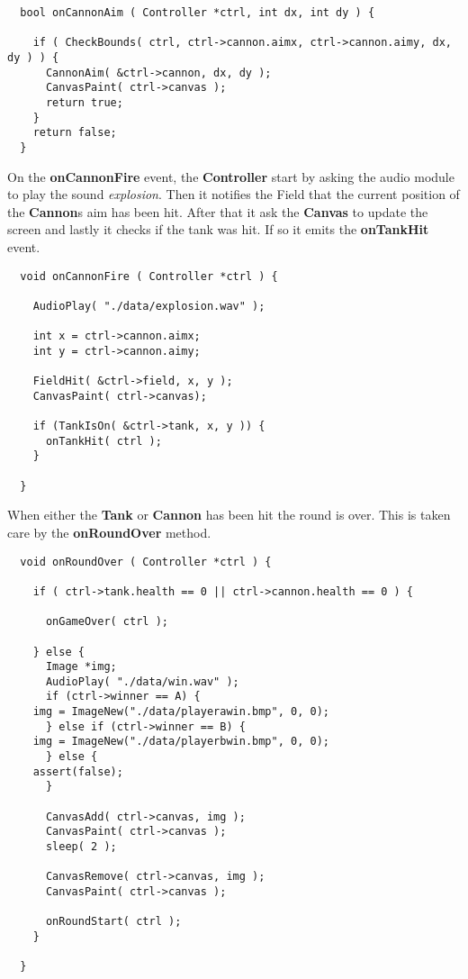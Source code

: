 \begin{lstlisting}
  bool onCannonAim ( Controller *ctrl, int dx, int dy ) {

    if ( CheckBounds( ctrl, ctrl->cannon.aimx, ctrl->cannon.aimy, dx, dy ) ) {
      CannonAim( &ctrl->cannon, dx, dy );
      CanvasPaint( ctrl->canvas );
      return true;
    }
    return false;
  }
\end{lstlisting}

On the {\bf onCannonFire} event, the {\bf Controller} start by asking the audio module to play the
sound {\it explosion}. Then it notifies the Field that the current position of the {\bf Cannon}s aim
has been hit. After that it ask the {\bf Canvas} to update the screen and lastly it checks if the
tank was hit. If so it emits the {\bf onTankHit} event.
\begin{lstlisting}
  void onCannonFire ( Controller *ctrl ) {

    AudioPlay( "./data/explosion.wav" );

    int x = ctrl->cannon.aimx;
    int y = ctrl->cannon.aimy;

    FieldHit( &ctrl->field, x, y );
    CanvasPaint( ctrl->canvas);

    if (TankIsOn( &ctrl->tank, x, y )) {
      onTankHit( ctrl );
    }

  }
\end{lstlisting}

When either the {\bf Tank} or {\bf Cannon} has been hit the round is over. This is
taken care by the {\bf onRoundOver} method.
\begin{lstlisting}
  void onRoundOver ( Controller *ctrl ) {

    if ( ctrl->tank.health == 0 || ctrl->cannon.health == 0 ) {

      onGameOver( ctrl );

    } else {
      Image *img;
      AudioPlay( "./data/win.wav" );
      if (ctrl->winner == A) {
	img = ImageNew("./data/playerawin.bmp", 0, 0);
      } else if (ctrl->winner == B) {
	img = ImageNew("./data/playerbwin.bmp", 0, 0);
      } else {
	assert(false);
      }

      CanvasAdd( ctrl->canvas, img );
      CanvasPaint( ctrl->canvas );
      sleep( 2 );

      CanvasRemove( ctrl->canvas, img );
      CanvasPaint( ctrl->canvas );

      onRoundStart( ctrl );
    }

  }
\end{lstlisting}


